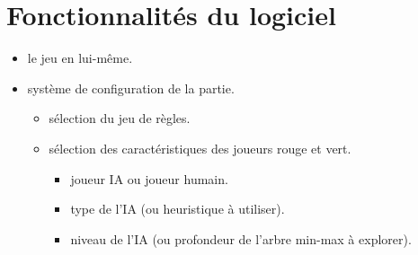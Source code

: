 \chapter{Fonctionnalités du logiciel}

\begin{itemize}
    \item le jeu en lui-même.
    \item système de configuration de la partie.
        \begin{itemize}
            \item sélection du jeu de règles.
            \item sélection des caractéristiques des joueurs rouge et vert.
                \begin{itemize}
                    \item joueur IA ou joueur humain.
                    \item type de l'IA (ou heuristique à utiliser).
                    \item niveau de l'IA (ou profondeur de l'arbre min-max à explorer).
                \end{itemize}
        \end{itemize}
\end{itemize}

